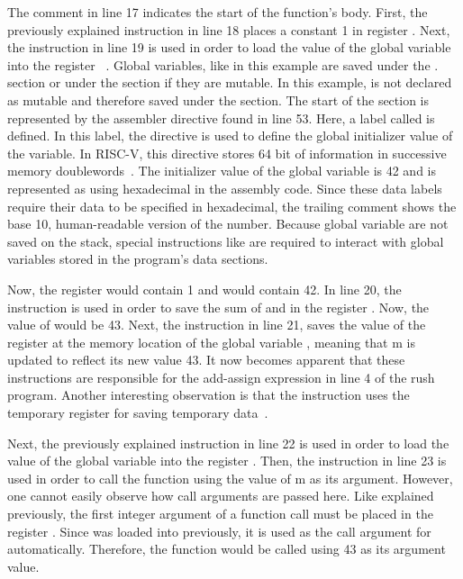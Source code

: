 The comment in line 17 indicates the start of the function's body.
First, the previously explained  instruction in line 18 places a constant 1 in register .
Next, the  instruction in line 19 is used in order to load the value of the global variable  into the register ~\cite[reference]{Patterson2017}.
Global variables, like  in this example are saved under the . section or under the  section if they are mutable.
In this example,  is not declared as mutable and therefore saved under the  section.
The start of the  section is represented by the  assembler directive found in line 53.
Here, a label called  is defined.
In this label, the  directive is used to define the global initializer value of the variable.
In RISC-V, this directive stores 64 bit of information in successive memory doublewords~\cite[p.~39]{Patterson2017}.
The initializer value of the global variable is 42 and is represented as  using hexadecimal in the assembly code. 
Since these data labels require their data to be specified in hexadecimal, the trailing comment shows the base 10, human-readable version of the number.
Because global variable are not saved on the stack, special instructions like  are required to interact with global variables stored in the program's data sections.

Now, the register  would contain 1 and  would contain 42.
In line 20, the  instruction is used in order to save the sum of  and  in the register .
Now, the value of  would be 43.
Next, the  instruction in line 21, saves the value of the register  at the memory location of the global variable , meaning that m is updated to reflect its new value 43.
It now becomes apparent that these instructions are responsible for the add-assign expression in line 4 of the rush program.
Another interesting observation is that the  instruction uses the temporary register  for saving temporary data~\cite[reference]{Patterson2017}.

Next, the previously explained  instruction in line 22 is used in order to load the value of the global variable into the register .
Then, the  instruction in line 23 is used in order to call the  function using the value of m as its argument.
However, one cannot easily observe how call arguments are passed here.
Like explained previously, the first integer argument of a function call must be placed in the register .
Since  was loaded into  previously, it is used as the call argument for  automatically.
Therefore, the  function would be called using 43 as its argument value.

